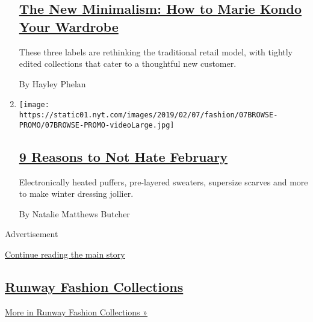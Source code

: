 \begin{enumerate}
  \hypertarget{the-new-minimalism-how-to-marie-kondo-your-wardrobe}{%
  \subsection{\texorpdfstring{\href{/2019/02/13/style/how-to-marie-kondo-your-wardrobe.html}{The
  New Minimalism: How to Marie Kondo Your
  Wardrobe}}{The New Minimalism: How to Marie Kondo Your Wardrobe}}\label{the-new-minimalism-how-to-marie-kondo-your-wardrobe}}

  These three labels are rethinking the traditional retail model, with
  tightly edited collections that cater to a thoughtful new customer.

  By Hayley Phelan
\item
  \texttt{[image: https://static01.nyt.com/images/2019/02/07/fashion/07BROWSE-PROMO/07BROWSE-PROMO-videoLarge.jpg]}

  \hypertarget{9-reasons-to-not-hate-february}{%
  \subsection{\texorpdfstring{\href{/2019/02/06/style/9-reasons-to-not-hate-february.html}{9
  Reasons to Not Hate
  February}}{9 Reasons to Not Hate February}}\label{9-reasons-to-not-hate-february}}

  Electronically heated puffers, pre-layered sweaters, supersize scarves
  and more to make winter dressing jollier.

  By Natalie Matthews Butcher
\end{enumerate}

Advertisement

\protect\hyperlink{after-mid4}{Continue reading the main story}

\hypertarget{runway-fashion-collections}{%
\subsection{\texorpdfstring{\href{/spotlight/fashion-runway-slideshows}{Runway
Fashion
Collections}}{Runway Fashion Collections}}\label{runway-fashion-collections}}

\href{/spotlight/fashion-runway-slideshows}{More in Runway Fashion
Collections »}

